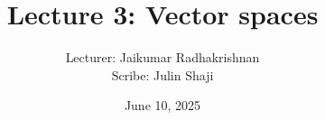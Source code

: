 \documentclass[12pt]{article}
\begin{document}
\title{Lecture 3: Vector spaces}
\author{Lecturer: Jaikumar Radhakrishnan\\ Scribe: Julin Shaji}
\date{June 10, 2025}
\maketitle
\end{document}
